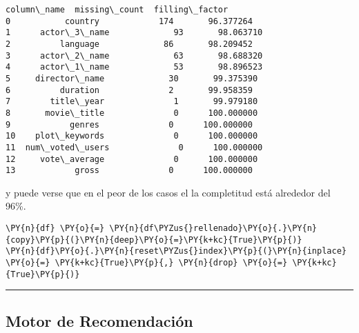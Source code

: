             \begin{tcolorbox}[breakable, size=fbox, boxrule=.5pt, pad at break*=1mm, opacityfill=0]
\begin{Verbatim}[commandchars=\\\{\}]
        column\_name  missing\_count  filling\_factor
0           country            174       96.377264
1      actor\_3\_name             93       98.063710
2          language             86       98.209452
3      actor\_2\_name             63       98.688320
4      actor\_1\_name             53       98.896523
5     director\_name             30       99.375390
6          duration              2       99.958359
7        title\_year              1       99.979180
8       movie\_title              0      100.000000
9            genres              0      100.000000
10    plot\_keywords              0      100.000000
11  num\_voted\_users              0      100.000000
12     vote\_average              0      100.000000
13            gross              0      100.000000
\end{Verbatim}
\end{tcolorbox}
        
    y puede verse que en el peor de los casos el la completitud está
alrededor del 96\%.

    \begin{tcolorbox}[breakable, size=fbox, boxrule=1pt, pad at break*=1mm,colback=cellbackground, colframe=cellborder]
\begin{Verbatim}[commandchars=\\\{\}]
\PY{n}{df} \PY{o}{=} \PY{n}{df\PYZus{}rellenado}\PY{o}{.}\PY{n}{copy}\PY{p}{(}\PY{n}{deep}\PY{o}{=}\PY{k+kc}{True}\PY{p}{)}
\PY{n}{df}\PY{o}{.}\PY{n}{reset\PYZus{}index}\PY{p}{(}\PY{n}{inplace} \PY{o}{=} \PY{k+kc}{True}\PY{p}{,} \PY{n}{drop} \PY{o}{=} \PY{k+kc}{True}\PY{p}{)}
\end{Verbatim}
\end{tcolorbox}

    \begin{center}\rule{0.5\linewidth}{0.5pt}\end{center}

\hypertarget{motor-de-recomendaciuxf3n}{%
\subsection{Motor de Recomendación}\label{motor-de-recomendaciuxf3n}}

